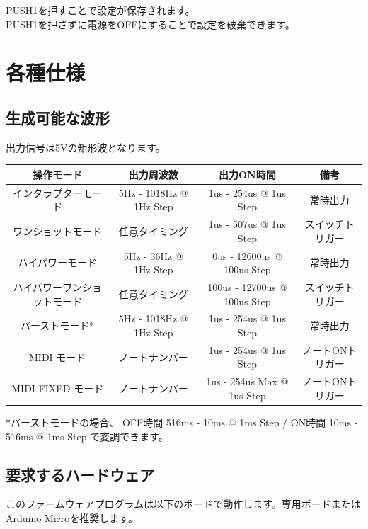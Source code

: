 \documentclass[a4paper,11pt]{jsarticle}
\begin{document}
PUSH1を押すことで設定が保存されます。 \\
PUSH1を押さずに電源をOFFにすることで設定を破棄できます。



\clearpage


\section{各種仕様}


\subsection{生成可能な波形}

出力信号は5Vの矩形波となります。

\begin{table}[htbp]
\begin{center}
\begin{tabular}{ | c | c | c | c | }
\hline
\textbf{操作モード} & \textbf{出力周波数} & \textbf{出力ON時間} & \textbf{備考} \\\hline
インタラプターモード & 5Hz - 1018Hz @ 1Hz Step & 1us - 254us @ 1us Step & 常時出力 \\\hline
ワンショットモード & 任意タイミング & 1us - 507us @ 1us Step & スイッチトリガー \\\hline
ハイパワーモード & 5Hz - 36Hz @ 1Hz Step & 0us - 12600us @ 100us Step & 常時出力 \\\hline
ハイパワーワンショットモード & 任意タイミング & 100us - 12700us @ 100us Step & スイッチトリガー \\\hline
バーストモード* & 5Hz - 1018Hz @ 1Hz Step & 1us - 254us @ 1us Step & 常時出力 \\\hline
MIDI モード & ノートナンバー & 1us - 254us @ 1us Step & ノートONトリガー \\\hline
MIDI FIXED モード & ノートナンバー & 1us - 254us Max @ 1us Step & ノートONトリガー \\\hline
\end{tabular}
\end{center}
\end{table}

*バーストモードの場合、
OFF時間 516ms - 10ms @ 1ms Step / 
ON時間 10ms - 516ms @ 1ms Step 
で変調できます。


\subsection{要求するハードウェア}
このファームウェアプログラムは以下のボードで動作します。専用ボードまたはArduino Microを推奨します。
\end{document}
